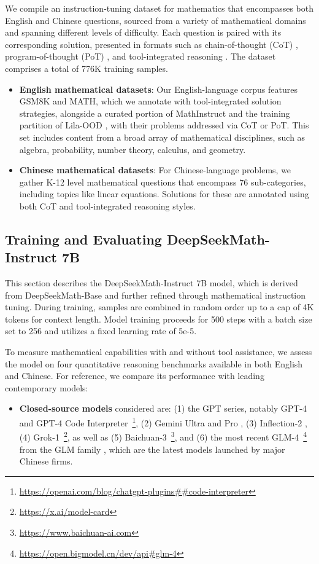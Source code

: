 We compile an instruction-tuning dataset for mathematics that encompasses both English and Chinese questions, sourced from a variety of mathematical domains and spanning different levels of difficulty. Each question is paired with its corresponding solution, presented in formats such as chain-of-thought (CoT) \citep{cot}, program-of-thought (PoT) \citep{pot,pal}, and tool-integrated reasoning \citep{tora}. The dataset comprises a total of 776K training samples.

\begin{itemize}[topsep=0pt]
    \item \textbf{English mathematical datasets}: Our English-language corpus features GSM8K and MATH, which we annotate with tool-integrated solution strategies, alongside a curated portion of MathInstruct \citep{MathInstruct} and the training partition of Lila-OOD \citep{lila}, with their problems addressed via CoT or PoT. This set includes content from a broad array of mathematical disciplines, such as algebra, probability, number theory, calculus, and geometry.
    \item \textbf{Chinese mathematical datasets}: For Chinese-language problems, we gather K-12 level mathematical questions that encompass 76 sub-categories, including topics like linear equations. Solutions for these are annotated using both CoT and tool-integrated reasoning styles.
\end{itemize}

\subsection{Training and Evaluating DeepSeekMath-Instruct 7B}

This section describes the DeepSeekMath-Instruct 7B model, which is derived from DeepSeekMath-Base and further refined through mathematical instruction tuning. During training, samples are combined in random order up to a cap of 4K tokens for context length. Model training proceeds for 500 steps with a batch size set to 256 and utilizes a fixed learning rate of 5e-5.

To measure mathematical capabilities with and without tool assistance, we assess the model on four quantitative reasoning benchmarks available in both English and Chinese. For reference, we compare its performance with leading contemporary models:

\begin{itemize}[topsep=0pt]
    \item \textbf{Closed-source models} considered are: (1) the GPT series, notably GPT-4 \citep{gpt4} and GPT-4 Code Interpreter~\footnote{\url{https://openai.com/blog/chatgpt-plugins\#\#code-interpreter}}, (2) Gemini Ultra and Pro \citep{gemini}, (3) Inflection-2 \citep{inflection-2}, (4) Grok-1~\footnote{\url{https://x.ai/model-card}}, as well as (5) Baichuan-3~\footnote{\url{https://www.baichuan-ai.com}}, and (6) the most recent GLM-4~\footnote{\url{https://open.bigmodel.cn/dev/api\#glm-4}} from the GLM family \citep{glm}, which are the latest models launched by major Chinese firms.
\end{itemize}

